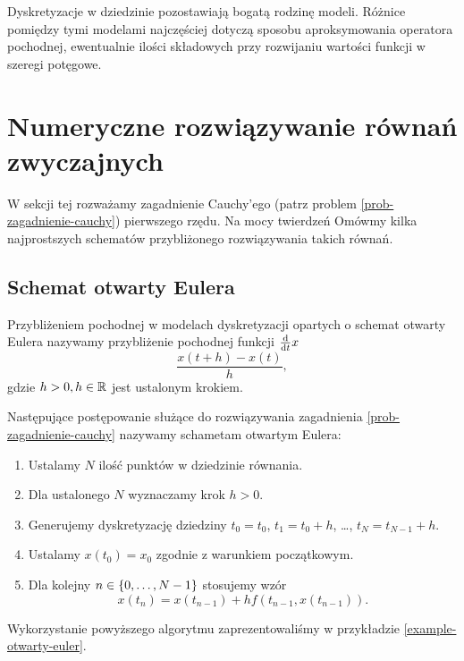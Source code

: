 \documentclass[12pt,a4paper]{report}
\begin{document}
Dyskretyzacje w dziedzinie pozostawiają bogatą rodzinę modeli. Różnice pomiędzy tymi modelami najczęściej dotyczą sposobu aproksymowania operatora pochodnej, ewentualnie ilości składowych przy rozwijaniu wartości funkcji w szeregi potęgowe. 


\section{Numeryczne rozwiązywanie równań zwyczajnych}

W sekcji tej rozważamy zagadnienie Cauchy'ego (patrz problem \ref{prob-zagadnienie-cauchy}) pierwszego rzędu. Na mocy twierdzeń 
Omówmy kilka najprostszych schematów przybliżonego rozwiązywania takich równań.

\subsection{Schemat otwarty Eulera}

\begin{definition}
Przybliżeniem pochodnej w modelach dyskretyzacji opartych o schemat otwarty Eulera nazywamy przybliżenie pochodnej funkcji $\frac{\mathrm{d} {} }{\mathrm{d}{t}}x$
$$
 \frac{x(t+h) - x(t)}{h},
$$
gdzie $h >0, h \in \mathbb{R} $ jest ustalonym krokiem. 
\end{definition}

\begin{algorithm}\label{Euler_algoritm}
Następujące postępowanie służące do rozwiązywania zagadnienia \ref{prob-zagadnienie-cauchy} nazywamy schametam otwartym Eulera:
\begin{enumerate}
\item Ustalamy $N$ ilość punktów w dziedzinie równania. 
\item Dla ustalonego $N$ wyznaczamy krok $h>0$. 
\item Generujemy dyskretyzację dziedziny $t_0 = t_0$, $t_1 = t_0 + h$, \ldots, $t_N = t_{N-1}+h$. 
\item Ustalamy $x(t_0) = x_0$ zgodnie z warunkiem początkowym.
\item Dla kolejny $n \in \left\lbrace {0, \ldots, N-1} \right\rbrace$ stosujemy wzór
$$
x(t_{n}) = x(t_{n-1}) + h f(t_{n-1}, x(t_{n-1})).
$$
\end{enumerate}
\end{algorithm}

Wykorzystanie powyższego algorytmu zaprezentowaliśmy w przykładzie \ref{example-otwarty-euler}.
\end{document}
